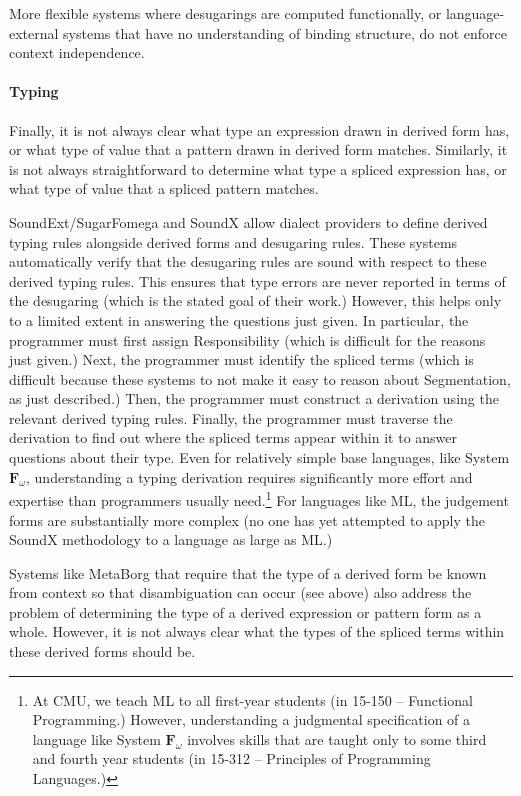 {More flexible systems where desugarings are computed functionally, or language-external systems that have no understanding of binding structure, do not enforce context independence.

\paragraph{Typing} Finally, it is not always clear what type an expression drawn in derived form has, or what type of value that a pattern drawn in derived form matches. Similarly, it is not always straightforward to determine what type a spliced expression has, or what type of value that a spliced pattern matches.

SoundExt/SugarFomega \cite{conf/popl/LorenzenE16} and SoundX \cite{conf/sle/RitschelE15} allow dialect providers to define derived typing rules alongside derived forms and desugaring rules. These systems automatically verify that the desugaring rules are sound with respect to these derived typing rules. This ensures that type errors are never reported in terms of the desugaring (which is the stated goal of their work.) However, this helps only to a limited extent in answering the questions just given. In particular, the programmer must first assign Responsibility (which is difficult for the reasons just given.) Next, the programmer must identify the spliced terms (which is difficult because these systems to not make it easy to reason about Segmentation, as just described.) Then, the programmer must construct a derivation using the relevant derived typing rules. Finally, the programmer must traverse the derivation to find out where the spliced terms appear within it to answer questions about their type. Even for relatively simple base languages, like System $\mathbf{F}_\omega$, understanding a typing derivation requires significantly more effort and expertise than programmers usually need.\footnote{At CMU, we teach ML to all first-year students (in 15-150 -- Functional Programming.) However, understanding a judgmental specification of a language like System $\mathbf{F}_\omega$ involves skills that are taught only to some third and fourth year students (in 15-312 -- Principles of Programming Languages.)} For languages like ML, the judgement forms are substantially more complex (no one has yet attempted to apply the SoundX methodology to a language as large as ML.)

Systems like MetaBorg that require that the type of a derived form be known from context so that disambiguation can occur (see above) also address the problem of determining the type of a derived expression or pattern form as a whole. However, it is not always clear what the types of the spliced terms within these derived forms should be.

}
